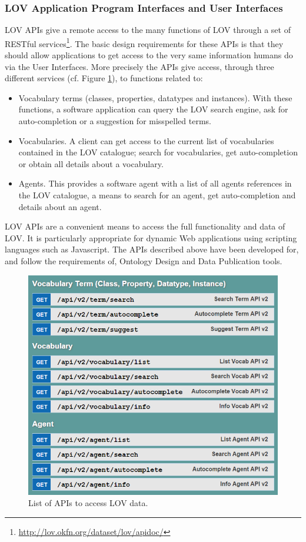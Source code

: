 \documentclass{iosart2c}
\begin{document}
\subsubsection{LOV Application Program Interfaces and User Interfaces}
LOV APIs give a remote access to the many functions of LOV through a set of RESTful services\footnote{\url{http://lov.okfn.org/dataset/lov/apidoc/}}. The basic design requirements for these APIs is that they should allow applications to get access to the very same information humans do via the User Interfaces. More precisely the APIs give access, through three different services (cf. Figure \ref{fig:apis}), to functions related to:
\begin{itemize} 
			\item Vocabulary terms (classes, properties, datatypes and instances). With these functions, a software application can query the LOV search engine, ask for auto-completion or a suggestion for misspelled terms.
			\item Vocabularies. A client can get access to the current list of vocabularies contained in the LOV catalogue; search for vocabularies, get auto-completion or obtain all details about a vocabulary.
			\item Agents. This provides a software agent with a list of all agents references in the LOV catalogue, a means to search for an agent, get auto-completion and details about an agent.
		\end{itemize}
LOV APIs are a convenient means to access the full functionality and data of LOV. It is particularly appropriate for dynamic Web applications using scripting languages such as Javascript. The APIs described above have been developed for, and follow the requirements of, Ontology Design and Data Publication tools.

\begin{figure}[ht!b]
\includegraphics[scale=0.4]{apis.png}
\caption{List of APIs to access LOV data.}
\label{fig:apis}
\end{figure}
\end{document}
